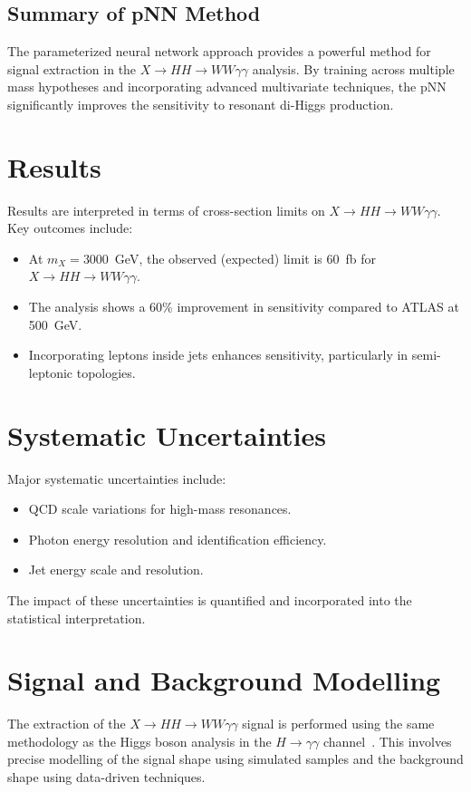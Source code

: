 \subsection{Summary of pNN Method}
The parameterized neural network approach provides a powerful method for signal extraction in the \(X \to HH \to WW\gamma\gamma\) analysis. By training across multiple mass hypotheses and incorporating advanced multivariate techniques, the pNN significantly improves the sensitivity to resonant di-Higgs production.

\section{Results}
Results are interpreted in terms of cross-section limits on \(X \to HH \to WW\gamma\gamma\). Key outcomes include:
\begin{itemize}
    \item At \(m_X = 3000\)~GeV, the observed (expected) limit is 60~fb for \(X \to HH \to WW\gamma\gamma\).
    \item The analysis shows a 60\% improvement in sensitivity compared to ATLAS at 500~GeV.
    \item Incorporating leptons inside jets enhances sensitivity, particularly in semi-leptonic topologies.
\end{itemize}

\section{Systematic Uncertainties}
Major systematic uncertainties include:
\begin{itemize}
    \item QCD scale variations for high-mass resonances.
    \item Photon energy resolution and identification efficiency.
    \item Jet energy scale and resolution.
\end{itemize}

The impact of these uncertainties is quantified and incorporated into the statistical interpretation.

\section{Signal and Background Modelling}
\label{sec:signal_background_modelling}

The extraction of the \(X \to HH \to WW\gamma\gamma\) signal is performed using the same methodology as the Higgs boson analysis in the \(H \to \gamma\gamma\) channel~\cite{CMS:2020xrn}. This involves precise modelling of the signal shape using simulated samples and the background shape using data-driven techniques.

